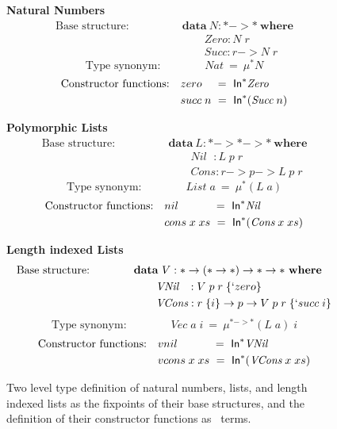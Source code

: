 \begin{figure}
{\bf Natural Numbers}
\begin{align*}
\text{Base structure:}\qquad\qquad
&\textbf{data}~N : * -> * ~\textbf{where} \\
&\qquad \textit{Zero} : N\;r\\
&\qquad \textit{Succ} : r -> N\;r
\end{align*}
\[\text{Type synonym:}\qquad\qquad \textit{Nat} ~=~ \mu^{*} N\]
\begin{align*}
\text{Constructor functions:}\quad
&zero~~\,~=~ \textsf{In}^{*} \textit{Zero} \\
&succ\;n ~=~ \textsf{In}^{*} (\textit{Succ}\;n)
\end{align*}

{\bf Polymorphic Lists}
\begin{align*}
\text{Base structure:}\qquad\qquad
&\textbf{data}~L : * -> * -> * ~\textbf{where} \\
&\qquad \textit{Nil}~~\, : L\;p\;r \\
&\qquad \textit{Cons}    : r -> p -> L\;p\;r
\end{align*}
\[\text{Type synonym:}\qquad\qquad \textit{List} \; a  ~=~ \mu^{*} (L\;a)\]
\begin{align*}
\text{Constructor functions:}\quad
&nil~~~~~~~~\,~=~ \textsf{In}^{*} \textit{Nil} \\
&cons\;x\;xs  ~=~ \textsf{In}^{*} (\textit{Cons}\;x\;xs)
\end{align*}

{\bf Length indexed Lists}
\begin{align*}
\text{Base structure:}\qquad\qquad
&\textbf{data}~V : * -> (* -> *) -> * -> * ~\textbf{where} \\
&\qquad \textit{VNil}~~\, : V\;p\;r\;\{`zero\} \\
&\qquad \textit{VCons}    : r\;\{i\} -> p -> V\;p\;r\;\{`succ\;i\}
\end{align*}
\[\text{Type synonym:}\qquad\qquad \textit{Vec}\;a\;i  ~=~ \mu^{* -> *} (L\;a) \;i\]
\begin{align*}
\text{Constructor functions:}\quad
&vnil~~~~~~~~\,~=~ \textsf{In}^{*} \textit{VNil} \\
&vcons\;x\;xs  ~=~ \textsf{In}^{*} (\textit{VCons}\;x\;xs)
\end{align*}


\caption{Two level type definition of natural numbers, lists, and
	 length indexed lists as the fixpoints of their base structures, and
         the definition of their constructor functions as \In\ terms.}
\label{fig:natdef}
\end{figure}
